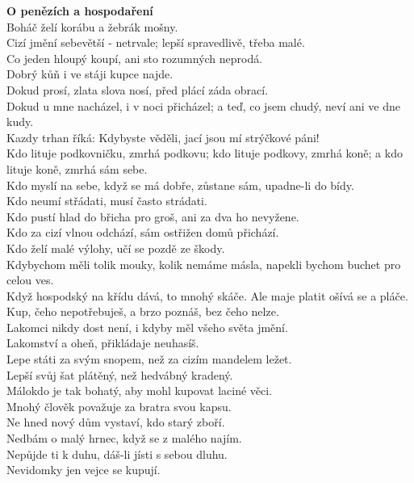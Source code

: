 \begin{multicols}{2}
\noindent
{\large\bf O penězích a hospodaření}\\[1 mm]
Boháč želí korábu a žebrák mošny.\\
Cizí jmění sebevětší - netrvale; lepší spravedlivě, třeba malé.\\
Co jeden hloupý koupí, ani sto rozumných neprodá.\\
Dobrý kůň i ve stáji kupce najde.\\
Dokud prosí, zlata slova nosí, před plácí záda obrací.\\
Dokud u mne nacházel, i v noci přicházel; a teď, co jsem chudý, 
neví ani ve dne kudy.\\
Kazdy trhan říká: Kdybyste věděli, jací jsou mí strýčkové páni!\\
Kdo lituje podkovničku, zmrhá podkovu; kdo lituje podkovy, zmrhá 
koně; a kdo lituje koně, zmrhá sám sebe.\\
Kdo myslí na sebe, když se má dobře, zůstane sám, upadne-li do 
bídy.\\
Kdo neumí střádati, musí často strádati.\\
Kdo pustí hlad do břicha pro groš, ani za dva ho nevyžene.\\
Kdo za cizí vlnou odchází, sám ostřižen domů přichází.\\
Kdo želí malé výlohy, učí se pozdě ze škody.\\
Kdybychom měli tolik mouky, kolik nemáme másla, napekli bychom 
buchet pro celou ves.\\
Když hospodský na křídu dává, to mnohý skáče. Ale maje platit 
ošívá se a pláče.\\
Kup, čeho nepotřebuješ, a brzo poznáš, bez čeho nelze.\\
Lakomci nikdy dost není, i kdyby měl všeho světa jmění.\\
Lakomství a oheň, přikládaje neuhasíš.\\
Lepe státi za svým snopem, než za cizím mandelem ležet.\\
Lepší svůj šat plátěný, než hedvábný kradený.\\
Málokdo je tak bohatý, aby mohl kupovat laciné věci.\\
Mnohý člověk považuje za bratra svou kapsu.\\
Ne hned nový dům vystaví, kdo starý zboří.\\
Nedbám o malý hrnec, když se z malého najím.\\
Nepůjde ti k duhu, dáš-li jísti s sebou dluhu.\\
Nevidomky jen vejce se kupují.\\

\end{multicols}
